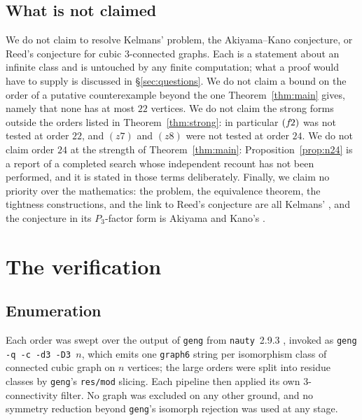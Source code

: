 \documentclass[11pt]{amsart}
\theoremstyle{plain}
\theoremstyle{definition}
\theoremstyle{remark}
\begin{document}
\subsection{What is not claimed}\label{ssec:notclaimed}
We do not claim to resolve Kelmans' problem, the Akiyama--Kano
conjecture, or Reed's conjecture for cubic $3$-connected graphs. Each is
a statement about an infinite class and is untouched by any finite
computation; what a proof would have to supply is discussed in
\S\ref{sec:questions}. We do not claim a bound on the order of a putative
counterexample beyond the one Theorem~\ref{thm:main} gives, namely that
none has at most $22$ vertices. We do not claim the strong forms outside
the orders listed in Theorem~\ref{thm:strong}: in particular $(f\mkern-2mu2)$ was
not tested at order $22$, and $(z7)$ and $(z8)$ were not tested at order
$24$. We do not claim order $24$ at the strength of
Theorem~\ref{thm:main}: Proposition~\ref{prop:n24} is a report of a
completed search whose independent recount has not been performed, and it
is stated in those terms deliberately. Finally, we claim no priority over
the mathematics: the problem, the equivalence theorem, the tightness
constructions, and the link to Reed's conjecture are all Kelmans'
\cite{Kel11}, and the conjecture in its $P_3$-factor form is Akiyama and
Kano's \cite{AK85}.

\section{The verification}\label{sec:comp}

\subsection{Enumeration}\label{ssec:enum}
Each order was swept over the output of \texttt{geng} from
\texttt{nauty}~2.9.3 \cite{nauty}, invoked as
\texttt{geng -q -c -d3 -D3 $n$}, which emits one \texttt{graph6} string
per isomorphism class of connected cubic graph on $n$ vertices; the large
orders were split into residue classes by \texttt{geng}'s \texttt{res/mod}
slicing. Each pipeline then applied its own $3$-connectivity filter. No
graph was excluded on any other ground, and no symmetry reduction beyond
\texttt{geng}'s isomorph rejection was used at any stage.
\end{document}
